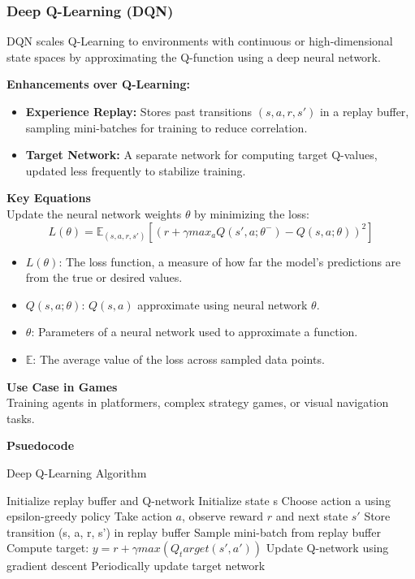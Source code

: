 \documentclass[12pt,oneside,openright,a4paper]{cpe-english-project}
\begin{document}
\subsubsection{Deep Q-Learning (DQN)}
DQN scales Q-Learning to environments with continuous or high-dimensional state spaces by approximating the Q-function using a deep neural network.\par
\textbf{Enhancements over Q-Learning:}
\begin{itemize}
\item  \textbf{Experience Replay:} Stores past transitions $(s,a,r,s')$ in a replay buffer, sampling mini-batches for training to reduce correlation.
\item  \textbf{Target Network:}  A separate network for computing target Q-values, updated less frequently to stabilize training.
\end{itemize}
\textbf{Key Equations} \\
Update the neural network weights $\theta$ by minimizing the loss:
\begin{equation}
L(\theta) = 	\mathbb{E}_{(s,a,r,s')}[(r + \gamma max_{a}Q(s',a;\theta^-)-Q(s,a;\theta))^2]
\end{equation}
\begin{itemize}
\item $L(\theta)$: The loss function, a measure of how far the model's predictions are from the true or desired values.
\item $Q(s,a;\theta)$: $Q(s,a)$ approximate using neural network $\theta$.
\item $\theta$: Parameters of a neural network used to approximate a function.
\item $\mathbb{E}$: The average value of the loss across sampled data points.
\end{itemize}
\textbf{Use Case in Games} \\
Training agents in platformers, complex strategy games, or visual navigation tasks.\par
\textbf{Psuedocode}
\begin{algorithm}
\caption{Deep Q-Learning Algorithm}\label{alg:DQLA}
\begin{algorithmic}
\State Initialize replay buffer and Q-network
\State Initialize state s
	\State Choose action a using epsilon-greedy policy
	\State Take action $a$, observe reward $r$ and next state $s'$	
	\State Store transition (s, a, r, s') in replay buffer
	\State Sample mini-batch from replay buffer
	\State Compute target: $y = r + \gamma max(Q_target(s', a'))$
	\State Update Q-network using gradient descent
	\State Periodically update target network
\EndWhile
\EndFor
\end{algorithmic}
\end{algorithm}
\end{document}

